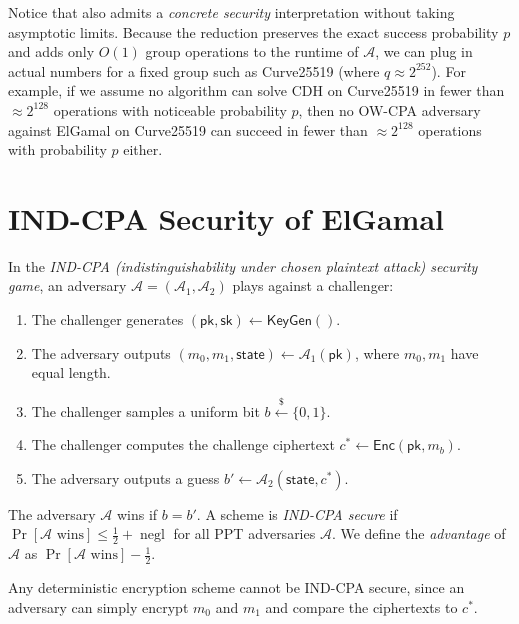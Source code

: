 Notice that  also admits a \emph{concrete security} interpretation without taking asymptotic limits. Because the reduction preserves the exact success probability \(p\) and adds only \(O(1)\) group operations to the runtime of \(\mathcal{A}\), we can plug in actual numbers for a fixed group such as Curve25519 (where \(q \approx 2^{252}\)). For example, if we assume no algorithm can solve CDH on Curve25519 in fewer than \(\approx 2^{128}\) operations with noticeable probability \(p\), then no OW-CPA adversary against ElGamal on Curve25519 can succeed in fewer than \(\approx 2^{128}\) operations with probability \(p\) either.

\section*{IND-CPA Security of ElGamal}

\begin{definition}
    In the \emph{IND-CPA (indistinguishability under chosen plaintext attack) security game}, an adversary \(\mathcal{A} = (\mathcal{A}_1, \mathcal{A}_2)\) plays against a challenger:
    \begin{enumerate}
        \item The challenger generates \((\mathsf{pk}, \mathsf{sk}) \gets \mathsf{KeyGen}()\).
        \item The adversary outputs \((m_0, m_1, \mathsf{state}) \gets \mathcal{A}_1(\mathsf{pk})\), where \(m_0, m_1\) have equal length.
        \item The challenger samples a uniform bit \(b \xleftarrow{\$} \{0, 1\}\).
        \item The challenger computes the challenge ciphertext \(c^* \gets \mathsf{Enc}(\mathsf{pk}, m_b)\).
        \item The adversary outputs a guess \(b' \gets \mathcal{A}_2(\mathsf{state}, c^*)\).
    \end{enumerate}
    The adversary \(\mathcal{A}\) wins if \(b = b'\).
    A scheme is \emph{IND-CPA secure} if \(\Pr[\mathcal{A} \text{ wins}] \le \frac{1}{2} + \operatorname{negl}\) for all PPT adversaries \(\mathcal{A}\).
    We define the \emph{advantage} of \(\mathcal{A}\) as \(\Pr[\mathcal{A} \text{ wins}] - \frac{1}{2}\).
\end{definition}

Any deterministic encryption scheme cannot be IND-CPA secure, since an adversary can simply encrypt \(m_0\) and \(m_1\) and compare the ciphertexts to \(c^*\).

